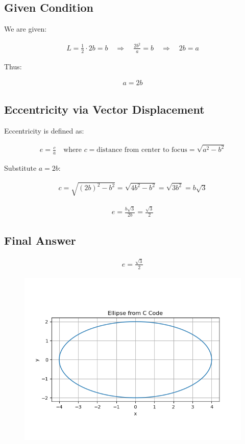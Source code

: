 \documentclass{article}
\begin{document}
\subsection*{Given Condition}

We are given:


\begin{align}
L = \frac{1}{2} \cdot 2b = b
\quad \Rightarrow \quad \frac{2b^2}{a} = b
\quad \Rightarrow \quad 2b = a
\end{align}



Thus:


\begin{align}
a = 2b
\end{align}



\subsection*{Eccentricity via Vector Displacement}

Eccentricity is defined as:


\begin{align}
e = \frac{c}{a}
\quad \text{where } c = \text{distance from center to focus} = \sqrt{a^2 - b^2}
\end{align}



Substitute $a = 2b$:


\begin{align}
c = \sqrt{(2b)^2 - b^2} = \sqrt{4b^2 - b^2} = \sqrt{3b^2} = b\sqrt{3}
\end{align}





\begin{align}
e = \frac{b\sqrt{3}}{2b} = \frac{\sqrt{3}}{2}
\end{align}



\subsection*{Final Answer}



\begin{align}
\boxed{e = \frac{\sqrt{3}}{2}}
\end{align}



\begin{figure}[H]
    \centering
    \includegraphics[width=0.7\linewidth]{./figs/Figure_1.png}
    \caption{}
    \label{fig:fig1}
\end{figure}
\end{document}
